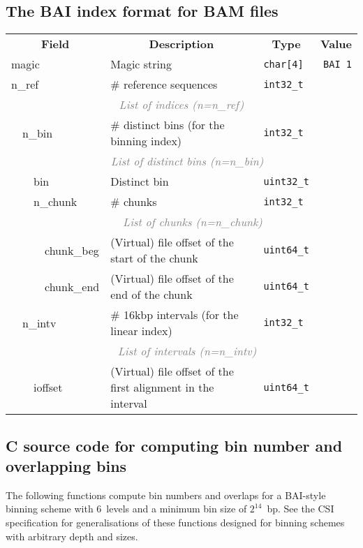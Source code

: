 \documentclass[10pt]{article}
\begin{document}
\subsection{The BAI index format for BAM files}
\begin{table}[ht]
{\small
\begin{tabular}{|l|l|l|l|l|l|r|}
  \cline{1-7}
  \multicolumn{4}{|c|}{\bf Field} & \multicolumn{1}{c|}{\bf Description} & \multicolumn{1}{c|}{\bf Type} & \multicolumn{1}{c|}{\bf Value} \\\cline{1-7}
  \multicolumn{4}{|l|}{\sf magic} & Magic string & {\tt char[4]} & {\tt BAI\char92 1}\\\cline{1-7}
  \multicolumn{4}{|l|}{\sf n\_ref} & \# reference sequences & {\tt int32\_t} & \\\cline{1-7}
  \multicolumn{7}{|c|}{\textcolor{gray}{\it List of indices (n=n\_ref)}} \\\cline{2-7}
  & \multicolumn{3}{l|}{\sf n\_bin} & \# distinct bins (for the binning index) & {\tt int32\_t} & \\\cline{2-7}
  & \multicolumn{6}{c|}{\textcolor{gray}{\it List of distinct bins (n=n\_bin)}} \\\cline{3-7}
  & & \multicolumn{2}{l|}{\sf bin} & Distinct bin & {\tt uint32\_t} & \\\cline{3-7}
  & & \multicolumn{2}{l|}{\sf n\_chunk} & \# chunks & {\tt int32\_t} & \\\cline{3-7}
  & & \multicolumn{5}{c|}{\textcolor{gray}{\it List of chunks (n=n\_chunk)}} \\\cline{4-7}
  & & & {\sf chunk\_beg} & (Virtual) file offset of the start of the chunk & {\tt uint64\_t} & \\\cline{4-7}
  & & & {\sf chunk\_end} & (Virtual) file offset of the end of the chunk & {\tt uint64\_t} & \\\cline{2-7}
  & \multicolumn{3}{l|}{\sf n\_intv} & \# 16kbp intervals (for the linear index) & {\tt int32\_t} & \\\cline{2-7}
  & \multicolumn{6}{c|}{\textcolor{gray}{\it List of intervals (n=n\_intv)}} \\\cline{3-7}
  & & \multicolumn{2}{l|}{\sf ioffset} & (Virtual) file offset of the first alignment in the interval & {\tt uint64\_t} & \\
  \cline{1-7}
\end{tabular}}
\end{table}

\subsection{C source code for computing bin number and overlapping bins}\label{sec:code}
The following functions compute bin numbers and overlaps for a BAI-style
binning scheme with $6$~levels and a minimum bin size of $2^{14}$~bp.
See the CSI specification for generalisations of these functions designed for
binning schemes with arbitrary depth and sizes.
\end{document}
